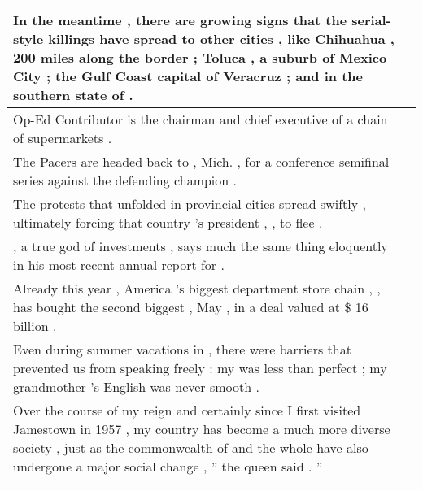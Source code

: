 \begin{table}
\begin{tabular}{p{} P{1,4cm} }
\hline
{} {In the meantime , there are growing signs that the serial-style killings have spread to other cities , like Chihuahua , 200 miles along the border ; Toluca , a suburb of Mexico City ; the Gulf Coast capital of Veracruz ; and \underline{} in the southern state of \underline{} .} &    \\ 
\hline
{} {Op-Ed Contributor \underline{} is the chairman and chief executive of a chain of \underline{} supermarkets .} &    \\ 
\hline
{} {The Pacers are headed back to \underline{} , Mich. , for a conference semifinal series against the defending champion \underline{} .} &    \\ 
\hline
{} {The protests that unfolded in provincial \underline{} cities spread swiftly , ultimately forcing that country 's president , \underline{} , to flee .} &    \\ 
\hline
{} {\underline{} , a true god of investments , says much the same thing eloquently in his most recent annual report for \underline{} .} &    \\ 
\hline
{} {Already this year , America 's biggest department store chain , \underline{} , has bought the second biggest , May \underline{} , in a deal valued at \$ 16 billion .} &    \\ 
\hline
{} {Even during summer vacations in \underline{} , there were barriers that prevented us from speaking freely : my \underline{} was less than perfect ; my grandmother 's English was never smooth .} &    \\ 
\hline
{} {Over the course of my reign and certainly since I first visited Jamestown in 1957 , my country has become a much more diverse society , just as the commonwealth of \underline{} and the whole \underline{} have also undergone a major social change , '' the queen said . ''} &    \\ 
\hline
\fi

\end{tabular} 



\end{table}